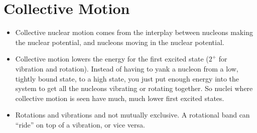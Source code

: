 \documentclass[letter]{article}
\begin{document}
\section{Collective Motion}

\begin{itemize}
\item Collective nuclear motion comes from the interplay between
  nucleons making the nuclear potential, and nucleons moving in the
  nuclear potential.~\cite[Lec. 13-16]{lecture}
\item Collective motion lowers the energy for the first excited state
  ($2^+$ for vibration and rotation). Instead of having to yank
  a nucleon from a low, tightly bound state, to a high state, you just
  put enough energy into the system to get all the nucleons vibrating
  or rotating together. So nuclei where collective motion is seen have
  much, much lower first excited states.
\item Rotations and vibrations and not mutually
  exclusive. A rotational band can ``ride'' on top of a vibration, or
  vice versa.
\end{itemize}
\end{document}
